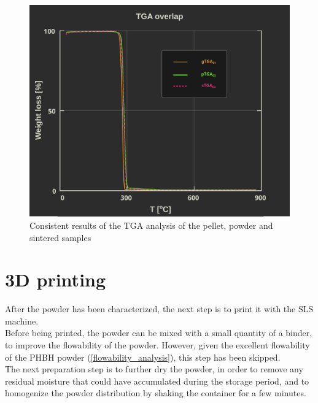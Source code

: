 \documentclass{article}
\begin{document}
            \begin{figure}[h!]
                \centering
                \includegraphics[width=\textwidth]{Pictures/Thermal_analysis_plots/TGA_catalogued/Fixed/TGA_overlapped.pdf}
                \caption{Consistent results of the TGA analysis of the pellet, powder and sintered samples}
                \label{fig:TGA_overlapped}
            \end{figure}




    \clearpage
    \section{3D printing\label{SLS_printing_experimental}}

    After the powder has been characterized, the next step is to print it with the SLS machine. \\

    Before being printed, the powder can be mixed with a small quantity of a binder, to improve the flowability of the powder. 
    However, given the excellent flowability of the PHBH powder (\ref{flowability_analysis}), this step has been skipped. \\

    The next preparation step is to further dry the powder, in order to remove any residual moisture
    that could have accumulated during the storage period, and to homogenize the powder distribution 
    by shaking the container for a few minutes. \\
\end{document}
